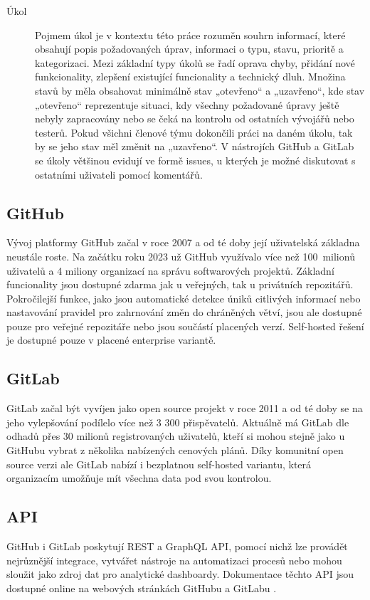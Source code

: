 \begin{description}
    \item[Úkol] Pojmem úkol je v kontextu této práce rozuměn souhrn informací, které obsahují popis požadovaných úprav, informaci o typu, stavu, prioritě a kategorizaci. Mezi základní typy úkolů se řadí oprava chyby, přidání nové funkcionality, zlepšení existující funcionality a technický dluh. Množina stavů by měla obsahovat minimálně stav „otevřeno“ a „uzavřeno“, kde stav „otevřeno“ reprezentuje situaci, kdy všechny požadované úpravy ještě nebyly zapracovány nebo se čeká na kontrolu od ostatních vývojářů nebo testerů. Pokud všichni členové týmu dokončili práci na daném úkolu, tak by se jeho stav měl změnit na „uzavřeno“. V nástrojích GitHub a GitLab se úkoly většinou evidují ve formě issues, u kterých je možné diskutovat s ostatními uživateli pomocí komentářů.
\end{description}

\subsection{GitHub}
Vývoj platformy GitHub začal v roce 2007 a od té doby její uživatelská základna neustále roste. Na začátku roku 2023 už GitHub využívalo více než 100~milionů uživatelů a 4 miliony organizací na správu softwarových projektů. \cite{GitHub, GitHub-about} Základní funcionality jsou dostupné zdarma jak u veřejných, tak u privátních repozitářů. Pokročilejší funkce, jako jsou automatické detekce úniků citlivých informací nebo nastavování pravidel pro zahrnování změn do chráněných větví, jsou ale dostupné pouze pro veřejné repozitáře nebo jsou součástí placených verzí. Self-hosted řešení je dostupné pouze v placené enterprise variantě. \cite{GitHub-pricing}

\subsection{GitLab}
GitLab začal být vyvíjen jako open source projekt v roce 2011 a od té doby se na jeho vylepšování podílelo více než 3 300 přispěvatelů. Aktuálně má GitLab dle odhadů přes 30 milionů registrovaných uživatelů, kteří si mohou stejně jako u GitHubu vybrat z několika nabízených cenových plánů. \cite{GitLab-about} Díky komunitní open source verzi ale GitLab nabízí i bezplatnou self-hosted variantu, která organizacím umožňuje mít všechna data pod svou kontrolou. \cite{GitLab-pricing}

\subsection{API}
GitHub i GitLab poskytují REST a GraphQL API, pomocí nichž lze provádět nejrůznější integrace, vytvářet nástroje na automatizaci procesů nebo mohou sloužit jako zdroj dat pro analytické dashboardy. Dokumentace těchto API jsou dostupné online na webových stránkách GitHubu \cite{GitHub-REST, GitHub-GraphQL} a GitLabu \cite{GitLab-REST, GitLab-GraphQL}.

